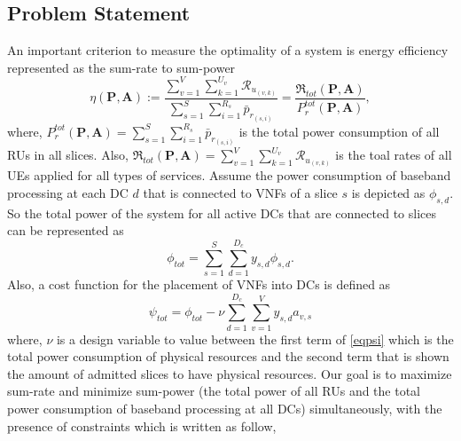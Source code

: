 \documentclass[conference]{IEEEtran}
\begin{document}
\subsection{Problem Statement}
An important criterion to measure the optimality of a system is energy efficiency represented as the sum-rate to sum-power
\begin{equation}
\textstyle \eta(\boldsymbol{P},\boldsymbol{A}) := \frac{\sum\limits_{v=1}^{V} \sum\limits_{k=1}^{{U}_v}\mathcal{R}_{u_{(v,k)}} }{\sum\limits_{s=1}^{S} \sum\limits_{i=1}^{{R}_s}\bar{p}_{r_{(s,i)}}} = \frac{\mathfrak{R}_{tot}(\boldsymbol{P},\boldsymbol{A})}{P_r^{{tot}}(\boldsymbol{P},\boldsymbol{A})},
\end{equation}
where, $P_r^{tot}(\boldsymbol{P},\boldsymbol{A}) = \sum\limits_{s=1}^{S}\sum\limits_{i=1}^{{R}_s}\bar{p}_{r_{(s,i)}}$ is the total power consumption of all RUs in all slices. Also, $\mathfrak{R}_{tot}(\boldsymbol{P},\boldsymbol{A}) = \sum\limits_{v=1}^{V} \sum\limits_{k=1}^{{U}_v}\mathcal{R}_{u_{(v,k)}} $ is the toal rates of all UEs applied for all types of services.
Assume the power consumption of baseband processing at each DC $d$ that is connected to VNFs of a slice $s$ is depicted as
$\phi_{s,d}$. So the total power of the system for all active DCs that are connected to slices can be represented as
\begin{equation*}
\textstyle \phi_{tot} = \sum_{s=1}^{S}\sum_{d=1}^{D_c}y_{s,d}\phi_{s,d}.
\end{equation*}
Also, a cost function for the placement of VNFs into DCs is defined as
\begin{equation}\label{eqpsi}
\textstyle  \psi_{tot} = \phi_{tot} - \nu \sum_{d=1}^{D_c}\sum_{v=1}^{V}y_{s,d}a_{v,s}
\end{equation}
where, $\nu$ is a design variable to value between the first term of \eqref{eqpsi} which is the total power consumption of physical resources and the second term that is shown the amount of admitted slices to have physical resources.
Our goal is to maximize sum-rate and minimize sum-power (the total power of all RUs and the total power consumption of baseband processing at all DCs) simultaneously, with the presence of constraints which is written as follow,
\end{document}
